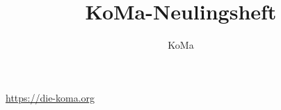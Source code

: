 \documentclass{neulingsheft}
\title{KoMa-Neulingsheft}
\author{KoMa}
\begin{document}
\maketitle

\tableofcontents









\clearpage
\centering\url{https://die-koma.org}
\end{document}
